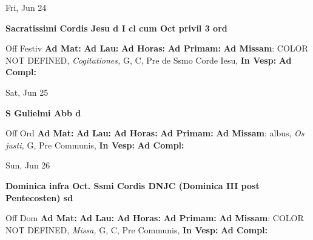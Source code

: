 \documentclass[10pt]{book}
\begin{document}
\begin{center}
\begin{minipage}{3.5in}
\vspace{2em}
\begin{center}Fri, Jun 24
\end{center}
\textbf{ \large Sacratissimi Cordis Jesu
\textnormal{\normalsize d I cl cum Oct privil 3 ord}}

\begin{justify}Off Festiv
\textbf{Ad Mat: }
\textbf{Ad Lau: }
\textbf{Ad Horas: }
\textbf{Ad Primam: }\textbf{Ad Missam}: COLOR NOT DEFINED, \textit{Cogitationes,} G, C, Pre de Ssmo Corde Iesu, 
\textbf{In Vesp: }
\textbf{Ad Compl: }
\end{justify}
\end{minipage}
\end{center}

\begin{center}
\begin{minipage}{3.5in}
\vspace{2em}
\begin{center}Sat, Jun 25
\end{center}
\textbf{ \large S Gulielmi Abb
\textnormal{\normalsize d}}

\begin{justify}Off Ord
\textbf{Ad Mat: }
\textbf{Ad Lau: }
\textbf{Ad Horas: }
\textbf{Ad Primam: }\textbf{Ad Missam}: albus, \textit{Os justi,} G, Pre Communis, 
\textbf{In Vesp: }
\textbf{Ad Compl: }
\end{justify}
\end{minipage}
\end{center}

\begin{center}
\begin{minipage}{3.5in}
\vspace{2em}
\begin{center}Sun, Jun 26
\end{center}
\textbf{ \large Dominica infra Oct. Ssmi Cordis DNJC (Dominica III post Pentecosten)
\textnormal{\normalsize sd}}

\begin{justify}Off Dom
\textbf{Ad Mat: }
\textbf{Ad Lau: }
\textbf{Ad Horas: }
\textbf{Ad Primam: }\textbf{Ad Missam}: COLOR NOT DEFINED, \textit{Missa,} G, C, Pre Communis, 
\textbf{In Vesp: }
\textbf{Ad Compl: }
\end{justify}
\end{minipage}
\end{center}
\end{document}
